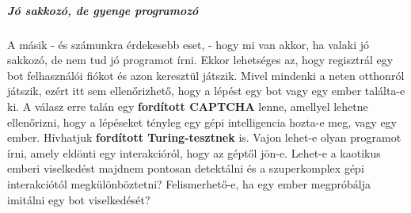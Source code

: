 \documentclass[twoside, a4paper, 12pt]{article}
\renewcommand{\listoffigures}{\begingroup
\tocsection
\tocfile{\listfigurename}{lof}
\endgroup}
\renewcommand{\listoftables}{\begingroup
\tocsection
\tocfile{\listtablename}{lot}
\endgroup}
\begin{document}
\subsubsection{Jó sakkozó, de gyenge programozó}A másik - és számunkra érdekesebb eset, - hogy mi van akkor, ha valaki jó sakkozó, de nem tud jó programot írni. Ekkor lehetséges az, hogy regisztrál egy bot felhasználói fiókot és azon keresztül játszik. Mivel mindenki a neten otthonról játszik, ezért itt sem ellenőrizhető, hogy a lépést egy bot vagy egy ember találta-e ki. A válasz erre talán egy \textbf{fordított CAPTCHA} lenne, amellyel lehetne ellenőrizni, hogy a lépéseket tényleg egy gépi intelligencia hozta-e meg, vagy egy ember. Hívhatjuk \textbf{fordított Turing-tesztnek} is. Vajon lehet-e olyan programot írni, amely eldönti egy interakcióról, hogy az géptől jön-e. Lehet-e a kaotikus emberi viselkedést majdnem pontosan detektálni és a szuperkomplex gépi interakciótól megkülönböztetni? Felismerhető-e, ha egy ember megpróbálja imitálni egy bot viselkedését?








































\newpage

\part{\bibname}

\listoffigures
\listoftables
\end{document}
